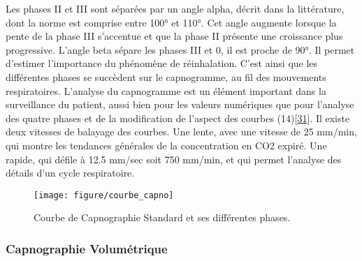 \documentclass[12pt,]{article}
\begin{document}
Les phases II et III sont séparées par un angle alpha, décrit dans la
littérature, dont la norme est comprise entre 100° et 110°. Cet angle
augmente lorsque la pente de la phase III s'accentue et que la phase II
présente une croissance plus progressive. L'angle beta sépare les phases
III et 0, il est proche de 90°. Il permet d'estimer l'importance du
phénomène de réinhalation. C'est ainsi que les différentes phases se
succèdent sur le capnogramme, au fil des mouvements respiratoires.
L'analyse du capnogramme est un élément important dans la surveillance
du patient, aussi bien pour les valeurs numériques que pour l'analyse
des quatre phases et de la modification de l'aspect des courbes
(14){[}\protect\hyperlink{ref-howe2011use}{31}{]}. Il existe deux
vitesses de balayage des courbes. Une lente, avec une vitesse de 25
mm/min, qui montre les tendances générales de la concentration en CO2
expiré. Une rapide, qui défile à 12.5 mm/sec soit 750 mm/min, et qui
permet l'analyse des détails d'un cycle respiratoire.

\begin{figure}[h!]

{\centering \texttt{[image: figure/courbe\_capno]} 

}

\caption{Courbe de Capnographie Standard et ses différentes phases.}\label{fig:unnamed-chunk-5}
\end{figure}

\hypertarget{capnographie-volumuxe9trique}{%
\subsubsection{Capnographie
Volumétrique}\label{capnographie-volumuxe9trique}}
\end{document}
